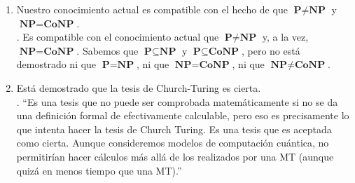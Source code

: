 \documentclass[12pt]{article}
\begin{document}
\begin{ejercicio}[2.4 puntos]
\begin{enumerate}
            \item Nuestro conocimiento actual es compatible con el hecho de que $\textbf{P} \neq \textbf{NP}$ y $\textbf{NP} = \textbf{CoNP}$. \\
            
            . Es compatible con el conocimiento actual que $\textbf{P}\neq\textbf{NP}$ y, a la vez, $\textbf{NP}=\textbf{CoNP}$. 
            Sabemos que $\textbf{P}\subseteq\textbf{NP}$ y $\textbf{P}\subseteq\textbf{CoNP}$, pero no está demostrado ni que $\textbf{P}=\textbf{NP}$, ni 
            que $\textbf{NP}=\textbf{CoNP}$, ni que $\textbf{NP}\neq\textbf{CoNP}$.

            \newpage

            \item Está demostrado que la tesis de Church-Turing es cierta. \\
            
            . ``Es una tesis que no puede ser comprobada matemáticamente si no se da una definición formal de efectivamente calculable, 
            pero eso es precisamente lo que intenta hacer la tesis de Church Turing. Es una tesis que es aceptada como cierta. Aunque consideremos modelos
            de computación cuántica, no permitirían hacer cálculos más allá de los realizados por una MT (aunque quizá en menos tiempo que una MT).''
        \end{enumerate}
    \end{ejercicio}
\end{document}
